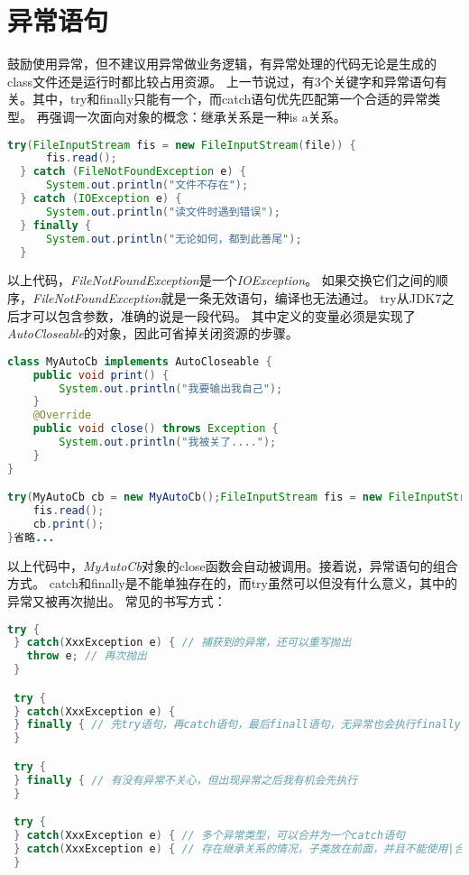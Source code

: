 \section{异常语句}
鼓励使用异常，但不建议用异常做业务逻辑，有异常处理的代码无论是生成的class文件还是运行时都比较占用资源。
上一节说过，有3个关键字和异常语句有关。其中，try和finally只能有一个，而catch语句优先匹配第一个合适的异常类型。
再强调一次面向对象的概念：继承关系是一种is a关系。

\begin{lstlisting}[language=Java]
  try(FileInputStream fis = new FileInputStream(file)) {
      fis.read();
  } catch (FileNotFoundException e) {
      System.out.println("文件不存在");
  } catch (IOException e) {
      System.out.println("读文件时遇到错误");
  } finally {
      System.out.println("无论如何，都到此善尾");
  }
\end{lstlisting}

以上代码，\emph{FileNotFoundException}是一个\emph{IOException}。
如果交换它们之间的顺序，\emph{FileNotFoundException}就是一条无效语句，编译也无法通过。
try从JDK7之后才可以包含参数，准确的说是一段代码。
其中定义的变量必须是实现了\emph{AutoCloseable}的对象，因此可省掉关闭资源的步骤。

\begin{lstlisting}[language=Java]
class MyAutoCb implements AutoCloseable {
    public void print() {
        System.out.println("我要输出我自己");
    }
    @Override
    public void close() throws Exception {
        System.out.println("我被关了....");
    }
}

try(MyAutoCb cb = new MyAutoCb();FileInputStream fis = new FileInputStream(file)) {
    fis.read();
    cb.print();
}省略...
\end{lstlisting}

\noindent
以上代码中，\emph{MyAutoCb}对象的close函数会自动被调用。接着说，异常语句的组合方式。
catch和finally是不能单独存在的，而try虽然可以但没有什么意义，其中的异常又被再次抛出。
常见的书写方式：

\begin{lstlisting}[language=Java]
 try {
 } catch(XxxException e) { // 捕获到的异常，还可以重写抛出
   throw e; // 再次抛出
 }

 try {
 } catch(XxxException e) {
 } finally { // 先try语句，再catch语句，最后finall语句，无异常也会执行finally
 }

 try {
 } finally { // 有没有异常不关心，但出现异常之后我有机会先执行
 }

 try {
 } catch(XxxException e) { // 多个异常类型，可以合并为一个catch语句
 } catch(XxxException e) { // 存在继承关系的情况，子类放在前面，并且不能使用|合并
 }
\end{lstlisting}

